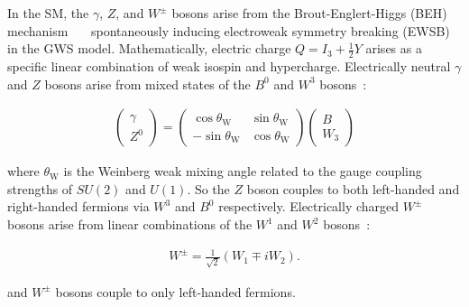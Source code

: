 In the SM, the $\gamma$, $Z$, and $W^\pm$ bosons arise from the Brout-Englert-Higgs (BEH) mechanism~\cite{HIGGS1964132}~\cite{PhysRevLett.13.508}~\cite{PhysRevLett.13.321} spontaneously inducing electroweak symmetry breaking (EWSB) in the GWS model.
Mathematically, electric charge $Q = I_3 + \frac{1}{2} Y$ arises as a specific linear combination of weak isospin and hypercharge.
Electrically neutral $\gamma$ and $Z$ bosons arise from mixed states of the $B^0$ and $W^3$ bosons~\cite{nagashima_2013_V2}:
\begin{linenomath*}
\begin{align}
\left(\begin{array}{c}
\gamma \\
Z^0
\end{array}\right)=\left(\begin{array}{cc}
\cos \theta_{\mathrm{W}} & \sin \theta_{\mathrm{W}} \\
-\sin \theta_{\mathrm{W}} & \cos \theta_{\mathrm{W}}
\end{array}\right)\left(\begin{array}{c}
B \\
W_3
\end{array}\right)
\label{}
\end{align}
\end{linenomath*}
where $\theta_{\mathrm{W}}$ is the Weinberg weak mixing angle related to the gauge coupling strengths of $SU(2)$ and $U(1)$.
So the $Z$ boson couples to both left-handed and right-handed fermions via $W^3$ and $B^0$ respectively.
Electrically charged $W^\pm$ bosons arise from linear combinations of the $W^1$ and $W^2$ bosons~\cite{nagashima_2013_V2}:
\begin{linenomath*}
\begin{align}
W^{\pm}=\frac{1}{\sqrt{2}}\left(W_1 \mp i W_2\right).
\end{align}
\end{linenomath*}
and $W^\pm$ bosons couple to only left-handed fermions.


